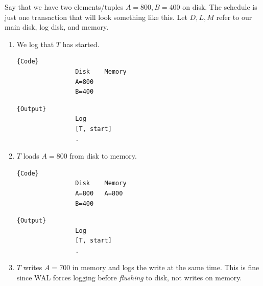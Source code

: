 \documentclass{article}
\begin{document}
      \begin{example}
        Say that we have two elements/tuples $A = 800, B = 400$ on disk. The schedule is just one transaction that will look something like this. Let $D, L, M$ refer to our main disk, log disk, and memory. 
        \begin{enumerate}
          \item We log that $T$ has started. 

            \noindent\begin{minipage}{.46\textwidth}
              \begin{lstlisting}[]{Code}
                Disk    Memory
                A=800   
                B=400
              \end{lstlisting}
              \end{minipage}
              \hfill
              \begin{minipage}{.45\textwidth}
              \begin{lstlisting}[]{Output}
                Log 
                [T, start]
                .
              \end{lstlisting}
            \end{minipage}

          \item $T$ loads $A=800$ from disk to memory. 

            \noindent\begin{minipage}{.46\textwidth}
              \begin{lstlisting}[]{Code}
                Disk    Memory
                A=800   A=800
                B=400
              \end{lstlisting}
              \end{minipage}
              \hfill
              \begin{minipage}{.45\textwidth}
              \begin{lstlisting}[]{Output}
                Log 
                [T, start]
                .
              \end{lstlisting}
            \end{minipage}

          \item $T$ writes $A=700$ in memory and logs the write at the same time. This is fine since WAL forces logging before \textit{flushing} to disk, not writes on memory. 


\end{enumerate}
\end{example}
\end{document}
